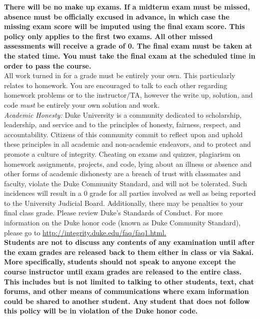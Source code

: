 \documentclass[11pt]{article}
\begin{document}
\textbf{There will be no make up exams. If a midterm exam must be missed, absence must be officially excused in advance, in which case the missing exam score will be imputed using the final exam score. This policy only applies to the first \textbf{two} exams. All other missed assessments will receive a grade of 0. The final exam must be taken at the stated time. You must take the final exam at the scheduled time in order to pass the course.}\\

All work turned in for a grade must be entirely your own. This particularly relates to homework. You are encouraged to talk to each other regarding homework problems or to the instructor/TA, however the write up, solution, and code \emph{must} be entirely your own solution and work. \\


\emph{Academic Honesty:} Duke University is a community dedicated to scholarship, leadership, and service and to the principles of honesty, fairness, respect, and accountability. Citizens of this community commit to reflect upon and uphold these principles in all academic and non-academic endeavors, and to protect and promote a culture of integrity. Cheating on exams and quizzes, plagiarism on homework assignments, projects, and code, lying about an illness or absence and other forms of academic dishonesty are a breach of trust with classmates and faculty, violate the Duke Community Standard, and will not be tolerated. Such incidences will result in a 0 grade for all parties involved as well as being reported to the University Judicial Board. Additionally, there may be penalties to your final class grade. Please review Duke's Standards of Conduct. For more information on the Duke honor code (known as Duke Community Standard), please go to \url{http://integrity.duke.edu/faq/faq1.html.}\\

\textbf{Students are not to discuss any contents of any examination until after the exam grades are released back to them either in class or via Sakai. More specifically, students should not speak to anyone except the course instructor until exam grades are released to the entire class. This includes but is not limited to talking to other students, text, chat forums, and other means of communications where exam information could be shared to another student. Any student that does not follow this policy will be in violation of the Duke honor code.}\\
\end{document}
